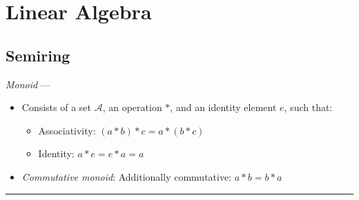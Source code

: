 \section{Linear Algebra}
\subsection*{Semiring}
\emph{Monoid} ---
\begin{itemize}
    \item Consists of a set $\mathcal{A}$, an operation $*$, and an identity element $e$, such that:
    \begin{itemize}
        \item Associativity: $(a * b) * c = a * (b * c)$
        \item Identity: $a * e = e * a = a$
    \end{itemize}
    \item \emph{Commutative monoid}: Additionally commutative: $a * b = b * a$
\end{itemize}

{\color{lightgray}\hrule height 0.001mm}


